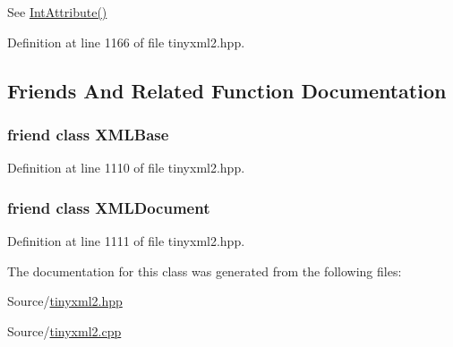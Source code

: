 See \hyperlink{classtinyxml2_1_1_x_m_l_element_af86f05771c11a73a2896b662bb589ef5}{Int\-Attribute()} 



Definition at line 1166 of file tinyxml2.\-hpp.



\subsection{Friends And Related Function Documentation}
\hypertarget{classtinyxml2_1_1_x_m_l_element_a449202cfc89e7ae5c2f81995476f9ec1}{
\subsubsection[{X\-M\-L\-Base}]{\setlength{\rightskip}{0pt plus 5cm}friend class X\-M\-L\-Base\hspace{0.3cm}{\ttfamily [friend]}}}\label{classtinyxml2_1_1_x_m_l_element_a449202cfc89e7ae5c2f81995476f9ec1}


Definition at line 1110 of file tinyxml2.\-hpp.

\hypertarget{classtinyxml2_1_1_x_m_l_element_a4eee3bda60c60a30e4e8cd4ea91c4c6e}{
\subsubsection[{X\-M\-L\-Document}]{\setlength{\rightskip}{0pt plus 5cm}friend class {\bf X\-M\-L\-Document}\hspace{0.3cm}{\ttfamily [friend]}}}\label{classtinyxml2_1_1_x_m_l_element_a4eee3bda60c60a30e4e8cd4ea91c4c6e}


Definition at line 1111 of file tinyxml2.\-hpp.



The documentation for this class was generated from the following files\-:\begin{DoxyCompactItemize}
\item 
Source/\hyperlink{tinyxml2_8hpp}{tinyxml2.\-hpp}\item 
Source/\hyperlink{tinyxml2_8cpp}{tinyxml2.\-cpp}\end{DoxyCompactItemize}
